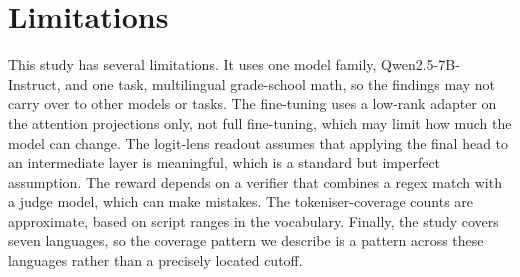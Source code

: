 \section{Limitations}
\label{sec:grpo-limitations}

This study has several limitations. It uses one model family, Qwen2.5-7B-Instruct,
and one task, multilingual grade-school math, so the findings may not carry over to
other models or tasks. The fine-tuning uses a low-rank adapter on the attention
projections only, not full fine-tuning, which may limit how much the model can change.
The logit-lens readout assumes that applying the final head to an intermediate layer
is meaningful, which is a standard but imperfect assumption. The reward depends on a
verifier that combines a regex match with a judge model, which can make mistakes. The
tokeniser-coverage counts are approximate, based on script ranges in the vocabulary.
Finally, the study covers seven languages, so the coverage pattern we describe is a
pattern across these languages rather than a precisely located cutoff.

